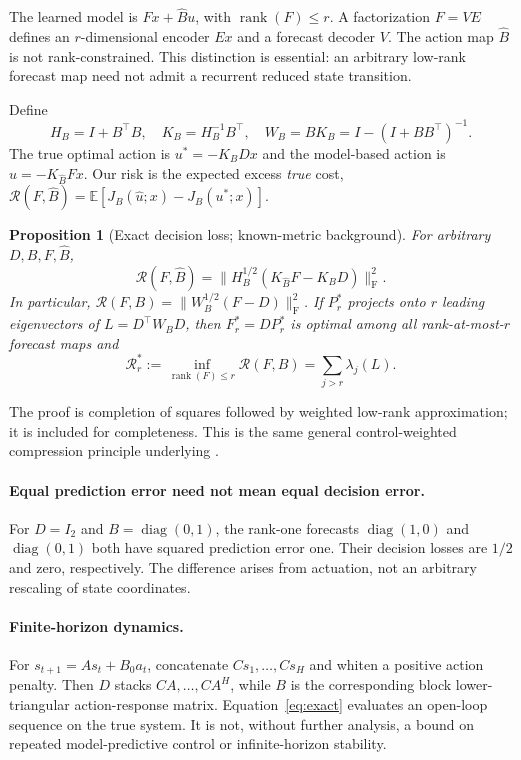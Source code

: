 \documentclass{article}
\newtheorem{proposition}[theorem]{Proposition}
\newcommand{\E}{\mathbb E}
\newcommand{\rank}{\operatorname{rank}}
\newcommand{\Reg}{\mathcal R}
\newcommand{\F}{\mathrm F}
\begin{document}
The learned model is $Fx+\widehat B u$, with $\rank(F)\le r$. A factorization $F=VE$ defines an $r$-dimensional encoder $Ex$ and a forecast decoder $V$. The action map $\widehat B$ is not rank-constrained. This distinction is essential: an arbitrary low-rank forecast map need not admit a recurrent reduced state transition.

Define
\begin{equation}\label{eq:metric}
 H_B=I+B^\top B,\quad K_B=H_B^{-1}B^\top,\quad
 W_B=BK_B=I-(I+BB^\top)^{-1}.
\end{equation}
The true optimal action is $u^*=-K_BDx$ and the model-based action is $\widehat u=-K_{\widehat B}Fx$. Our risk is the expected excess \emph{true} cost,
$\Reg(F,\widehat B)=\E[J_B(\widehat u;x)-J_B(u^*;x)]$.

\begin{proposition}[Exact decision loss; known-metric background]\label{prop:exact}
For arbitrary $D,B,F,\widehat B$,
\begin{equation}\label{eq:exact}
 \Reg(F,\widehat B)=\|H_B^{1/2}(K_{\widehat B}F-K_BD)\|_\F^2.
\end{equation}
In particular, $\Reg(F,B)=\|W_B^{1/2}(F-D)\|_\F^2$. If $P_r^*$ projects onto $r$ leading eigenvectors of $L=D^\top W_BD$, then $F_r^*=DP_r^*$ is optimal among all rank-at-most-$r$ forecast maps and
\begin{equation}\label{eq:oracle}
 \Reg_r^*:=\inf_{\rank(F)\le r}\Reg(F,B)=\sum_{j>r}\lambda_j(L).
\end{equation}
\end{proposition}
The proof is completion of squares followed by weighted low-rank approximation; it is included for completeness. This is the same general control-weighted compression principle underlying \citet{cheng2021}.

\paragraph{Equal prediction error need not mean equal decision error.}
For $D=I_2$ and $B=\operatorname{diag}(0,1)$, the rank-one forecasts $\operatorname{diag}(1,0)$ and $\operatorname{diag}(0,1)$ both have squared prediction error one. Their decision losses are $1/2$ and zero, respectively. The difference arises from actuation, not an arbitrary rescaling of state coordinates.

\paragraph{Finite-horizon dynamics.}
For $s_{t+1}=As_t+B_0a_t$, concatenate $Cs_1,\ldots,Cs_H$ and whiten a positive action penalty. Then $D$ stacks $CA,\ldots,CA^H$, while $B$ is the corresponding block lower-triangular action-response matrix. Equation~\eqref{eq:exact} evaluates an open-loop sequence on the true system. It is not, without further analysis, a bound on repeated model-predictive control or infinite-horizon stability.
\end{document}
